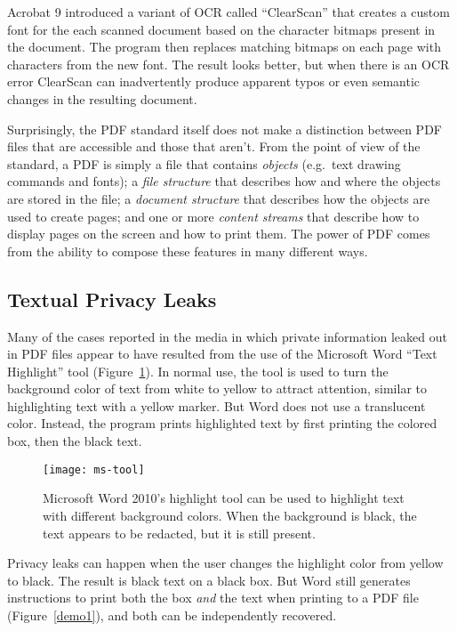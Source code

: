 Acrobat 9 introduced a variant of OCR called
``ClearScan'' that creates a custom font for the each scanned
document based on the character bitmaps present in the document. The
program then replaces matching bitmaps on each page with characters
from the new font.  The result looks better, but when there is an OCR
error ClearScan can inadvertently produce apparent typos or even semantic changes in the resulting
document.

Surprisingly, the PDF standard itself does not make a distinction
between PDF files that are accessible and those that aren't. From the
point of view of the standard, a PDF is simply a file that contains
\emph{objects} (e.g.\ text drawing commands and fonts); a \emph{file
  structure} that describes how and where the objects are stored in
the file; a \emph{document structure} that describes how the objects
are used to create pages; and one or more \emph{content streams} that
describe how to display pages on the screen and how to print them.  The
power of  PDF comes from the ability to compose  these features in  many different ways. 


\subsection{Textual Privacy Leaks}

Many of the cases reported in the media in which private information
leaked out in PDF files appear to have resulted from the use of the
Microsoft Word ``Text Highlight'' tool (Figure~\ref{ms-tool}).  In
normal use, the tool is used to turn the background color of text from
white to yellow to attract
attention, similar to highlighting text with a
yellow marker. But Word does not use a translucent
color. Instead, the program prints highlighted text by first printing
the colored box, then the black text.

\begin{figure}
\texttt{[image: ms-tool]}
\caption{Microsoft Word 2010's highlight tool can be used to highlight
  text with different background colors. When the background is
  black, the text appears to be redacted, but it is still present.}\label{ms-tool}
\end{figure}

Privacy leaks can happen when
the user changes the highlight color from yellow to black. The result
is black text on a black box.  But Word still generates
instructions to print both the  box \emph{and} the 
text when printing to a PDF file (Figure~\ref{demo1}), and both can be
independently recovered. 

